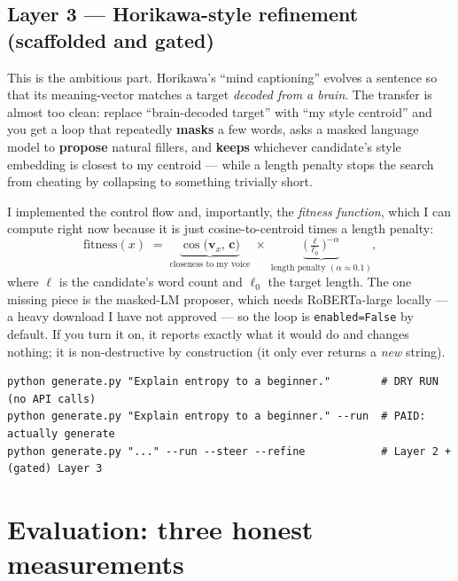 \documentclass[11pt]{article}
\newcommand{\code}[1]{\texttt{#1}}
\newcommand{\cossim}{\operatorname{cos}}
\begin{document}
\subsection{Layer 3 --- Horikawa-style refinement (scaffolded and gated)}

This is the ambitious part. Horikawa's ``mind captioning'' evolves a sentence so that its
meaning-vector matches a target \emph{decoded from a brain}. The transfer is almost too clean:
replace ``brain-decoded target'' with ``my style centroid'' and you get a loop that repeatedly
\textbf{masks} a few words, asks a masked language model to \textbf{propose} natural fillers, and
\textbf{keeps} whichever candidate's style embedding is closest to my centroid --- while a length
penalty stops the search from cheating by collapsing to something trivially short.

I implemented the control flow and, importantly, the \emph{fitness function}, which I can compute
right now because it is just cosine-to-centroid times a length penalty:
\[
  \text{fitness}(x)
  \;=\;
  \underbrace{\cossim\!\big(\mathbf{v}_x,\, \mathbf{c}\big)}_{\text{closeness to my voice}}
  \;\times\;
  \underbrace{\Big(\tfrac{\ell}{\ell_0}\Big)^{-\alpha}}_{\text{length penalty } (\alpha \approx 0.1)},
\]
where $\ell$ is the candidate's word count and $\ell_0$ the target length. The one missing piece is
the masked-LM proposer, which needs RoBERTa-large locally --- a heavy download I have not approved
--- so the loop is \code{enabled=False} by default. If you turn it on, it reports exactly what it
would do and changes nothing; it is non-destructive by construction (it only ever returns a
\emph{new} string).

\begin{lstlisting}
python generate.py "Explain entropy to a beginner."        # DRY RUN (no API calls)
python generate.py "Explain entropy to a beginner." --run  # PAID: actually generate
python generate.py "..." --run --steer --refine            # Layer 2 + (gated) Layer 3
\end{lstlisting}

\section{Evaluation: three honest measurements}
\end{document}
